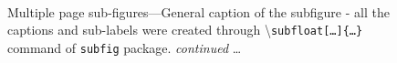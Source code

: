\documentclass[phd]{ndsu-thesis-2022}
\newcommand\cmd[1]{\textbackslash\texttt{#1}}  %
\begin{document}
\begin{figure}[H]
\hspace{0.5in}
\\
\captionsetup{singlelinecheck=false} %
\caption{Multiple page sub-figures---General caption of the subfigure - all the captions and sub-labels were created through \cmd{subfloat[\ldots]\{\ldots\}} command of \texttt{subfig} package. \emph{continued} \ldots} \label{fig:1gen}
\end{figure}
\clearpage
\end{document}
